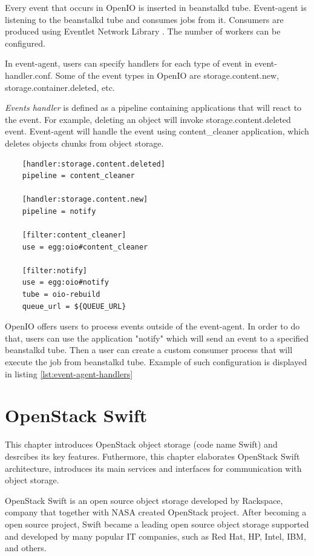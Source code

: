     Every event that occurs in OpenIO is inserted in beanstalkd tube. Event-agent is listening to the beanstalkd tube and consumes jobs from it. Consumers are produced using Eventlet Network Library \cite{oioEventlet}. The number of workers can be configured.

    In event-agent, users can specify handlers for each type of event in event-handler.conf.
    Some of the event types in OpenIO are storage.content.new, storage.container.deleted, etc.

    \textit{Events handler} is defined as a pipeline containing applications that will react to the event. For example, deleting an object will invoke storage.content.deleted event. Event-agent will handle the event using content\_cleaner application, which deletes objects chunks from object storage.

    \lstset{
        caption=Example of event-agent handler configuration,
        label=lst:event-agent-handlers
    }
    \begin{lstlisting}
    [handler:storage.content.deleted]
    pipeline = content_cleaner

    [handler:storage.content.new]
    pipeline = notify

    [filter:content_cleaner]
    use = egg:oio#content_cleaner

    [filter:notify]
    use = egg:oio#notify
    tube = oio-rebuild
    queue_url = ${QUEUE_URL}
    \end{lstlisting}

    OpenIO offers users to process events outside of the event-agent. In order to do that, users can use the application "notify" which will send an event to a specified beanstalkd tube. Then a user can create a custom consumer process that will execute the job from beanstalkd tube. Example of such configuration is displayed in listing \ref{lst:event-agent-handlers}

\chapter{OpenStack Swift}
    This chapter introduces OpenStack object storage (code name Swift) and desrcibes its key features. Futhermore, this chapter elaborates OpenStack Swift architecture, introduces its main services and interfaces for communication with object storage.

    OpenStack Swift is an open source object storage developed by Rackspace, company that together with NASA created OpenStack project. After becoming a open source project, Swift became a leading open source object storage supported and developed by many popular IT companies, such as Red Hat, HP, Intel, IBM, and others.

